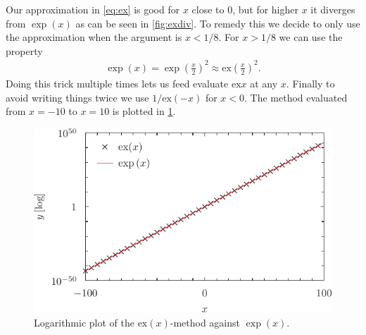 \documentclass[UKenglish,a4paper, 11pt]{article}
\newcommand{\ex}{\mathrm{ex}}
\begin{document}
Our approximation in \cref{eq:ex} is good for $x$ close to 0, but for higher $x$ it diverges from $\exp (x)$ as can be seen in \cref{fig:exdiv}.	To remedy this we decide to only use the approximation when the argument is $x<1/8$. For $x>1/8$ we can use the property
\begin{align}
	\exp( x) = \exp\left(\frac{x}{2}\right)^2 \approx \ex \left(\frac{x}{2}\right)^2.
\end{align}
Doing this trick multiple times lets us feed evaluate $\ex x$ at any $x$. Finally to avoid writing things twice we use $1/\ex(-x)$ for $x<0$. The method evaluated from $x=-10$ to $x=10$ is plotted in \cref{fig:testplot}.
\begin{figure}[h]
	\centering
	\includegraphics{testplot.pdf}
	\caption{Logarithmic plot of the $\ex (x)$-method against $\exp(x)$.}\label{fig:testplot}
\end{figure}
\end{document}
